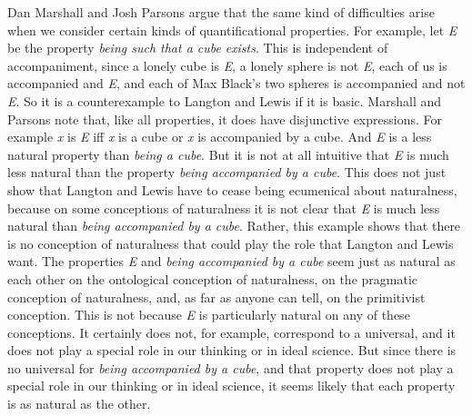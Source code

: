 Dan Marshall and Josh Parsons \citet{Marshall2001} argue that the same kind of difficulties arise when we consider certain kinds of quantificational properties. For example, let \textit{E} be the property \textit{being such that a cube} \textit{exists}. This is independent of accompaniment, since a lonely cube is \textit{E}, a lonely sphere is not \textit{E}, each of us is accompanied and \textit{E}, and each of Max Black's two spheres is accompanied and not \textit{E}. So it is a counterexample to Langton and Lewis if it is basic. Marshall and Parsons note that, like all properties, it does have disjunctive expressions. For example \textit{x} is \textit{E} iff \textit{x} is a cube or \textit{x} is accompanied by a cube. And \textit{E} is a less natural property than \textit{being a cube}. But it is not at all intuitive that \textit{E} is much less natural than the property \textit{being accompanied by a cube}. This does not just show that Langton and Lewis have to cease being ecumenical about naturalness, because on some conceptions of naturalness it is not clear that \textit{E} is much less natural than \textit{being accompanied by a cube}. Rather, this example shows that there is no conception of naturalness that could play the role that Langton and Lewis want. The properties \textit{E} and \textit{being accompanied by a cube }seem just as natural as each other on the ontological conception of naturalness, on the pragmatic conception of naturalness, and, as far as anyone can tell, on the primitivist conception. This is not because \textit{E} is particularly natural on any of these conceptions. It certainly does not, for example, correspond to a universal, and it does not play a special role in our thinking or in ideal science. But since there is no universal for \textit{being accompanied by a cube}, and that property does not play a special role in our thinking or in ideal science, it seems likely that each property is as natural as the other.

